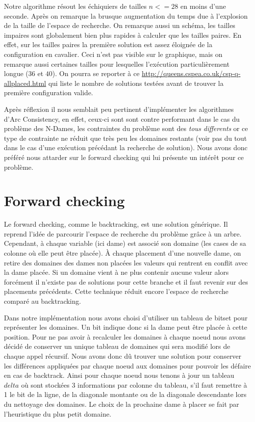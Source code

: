 \documentclass[10pt,a4paper]{report}
\begin{document}
Notre algorithme résout les échiquiers de tailles $n <= 28$ en moins d'une seconde. Après on remarque la brusque augmentation du temps due à l'explosion de la taille de l'espace de recherche.
On remarque aussi un schéma, les tailles impaires sont globalement bien plus rapides à calculer que les tailles paires. En effet, sur les tailles paires la première solution est assez éloignée de la configuration en cavalier.
Ceci n'est pas visible sur le graphique, mais on remarque aussi certaines tailles pour lesquelles l’exécution particulièrement longue ($36$ et $40$).
On pourra se reporter à ce \url{http://queens.cspea.co.uk/csp-q-allplaced.html} qui liste le nombre de solutions testées avant de trouver la première configuration valide.

Après réflexion il nous semblait peu pertinent d'implémenter les algorithmes d'Arc Consistency, en effet, ceux-ci sont sont contre performant dans le cas du problème des N-Dames, les contraintes du problème sont des
\textit{tous differents} or ce type de contrainte ne réduit que très peu les domaines restants (voir pas du tout dans le cas d'une exécution précédant la recherche de solution).
Nous avons donc préféré nous attarder sur le forward checking qui lui présente un intérêt pour ce problème.

\break
\section{Forward checking}

Le forward checking, comme le backtracking, est une solution générique. Il reprend l'idée de parcourir l'espace de recherche du problème grâce à un arbre.
Cependant, à chaque variable (ici dame) est associé son domaine (les cases de sa colonne où elle peut être placée).
À chaque placement d'une nouvelle dame, on retire des domaines des dames non placées les valeurs qui rentrent en conflit avec la dame placée.
Si un domaine vient à ne plus contenir aucune valeur alors forcément il n'existe pas de solutions pour cette branche et il faut revenir sur des placements précédents.
Cette technique réduit encore l'espace de recherche comparé au backtracking.

Dans notre implémentation nous avons choisi d'utiliser un tableau de bitset pour représenter les domaines.
Un bit indique donc si la dame peut être placée à cette position.
Pour ne pas avoir à recalculer les domaines à chaque noeud nous avons décidé de conserver un unique tableau de domaines qui sera modifié lors de chaque appel récursif.
Nous avons donc dû trouver une solution pour conserver les différences appliquées par chaque noeud aux domaines pour pouvoir les défaire en cas de backtrack.
Ainsi pour chaque noeud nous tenons à jour un tableau $delta$ où sont stockées 3 informations par colonne du tableau,
s'il faut remettre à 1 le bit de la ligne, de la diagonale montante ou de la diagonale descendante lors du nettoyage des domaines.
Le choix de la prochaine dame à placer se fait par l'heuristique du plus petit domaine.
\end{document}
